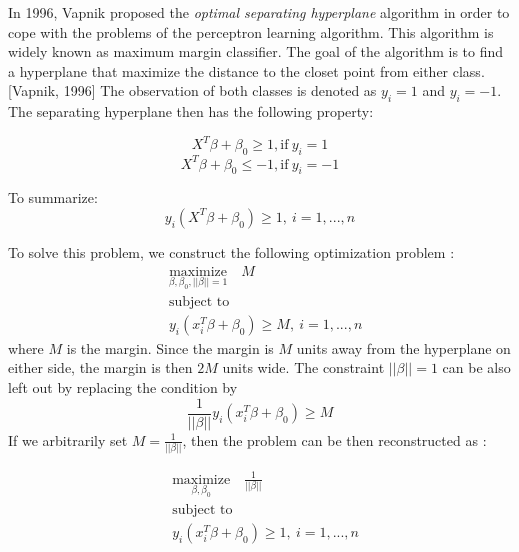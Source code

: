 In 1996, Vapnik proposed the \emph{optimal separating hyperplane} algorithm in order to cope with the problems of the perceptron learning algorithm.
This algorithm is widely known as maximum margin classifier.
The goal of the algorithm is to find a hyperplane that maximize the distance to the closet point from either class. [Vapnik, 1996]
The observation of both classes is denoted as $y_i = 1$ and $y_i = -1$. The separating hyperplane then has the following property:

\begin{equation}
    X^T \beta + \beta_0 \geq 1, \text{if}\ y_i = 1
\end{equation}
\begin{equation}
    X^T \beta + \beta_0 \leq -1, \text{if}\ y_i = -1
\end{equation}

To summarize:
\begin{equation}
    y_i(X^T \beta + \beta_0) \geq 1,\ i = 1, ..., n
\end{equation}

To solve this problem, we construct the following optimization problem \cite{R9}:
\begin{equation}
    \begin{aligned}
      & \underset{\textstyle {\beta, \beta_0, ||\beta||=1}}{\text{maximize}} \quad
        M \\
      & \text{subject to} \\
      & y_i(x_i^T \beta + \beta_0) \geq M,\ i = 1, ..., n
    \end{aligned}
\end{equation}
where $M$ is the margin. Since the margin is $M$ units away from the hyperplane on either side,
the margin is then $2M$ units wide. The constraint $||\beta|| = 1$ can be also left out by replacing
the condition by
\begin{equation}
    \frac{1}{||\beta||}y_i(x_i^T \beta + \beta_0) \geq M
\end{equation}
If we arbitrarily set $M = \frac{1}{||\beta||}$, then the problem can be then reconstructed as \cite{Elements4}:

\begin{equation}
    \begin{aligned}
      & \underset{\textstyle {\beta, \beta_0}}{\text{maximize}} \quad
        \frac 1 {||\beta||} \\
      & \text{subject to} \\
      & y_i(x_i^T \beta + \beta_0) \geq 1,\ i = 1, ..., n
    \end{aligned}
\end{equation}

